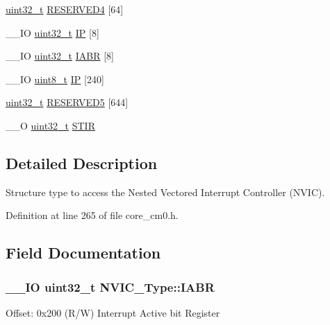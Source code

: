 \begin{DoxyCompactItemize}
\item 
\hyperlink{stdint_8h_a435d1572bf3f880d55459d9805097f62}{uint32\-\_\-t} \hyperlink{struct_n_v_i_c___type_a712f552dc4649746daadfe9b86d88665}{R\-E\-S\-E\-R\-V\-E\-D4} \mbox{[}64\mbox{]}
\item 
\-\_\-\-\_\-\-I\-O \hyperlink{stdint_8h_a435d1572bf3f880d55459d9805097f62}{uint32\-\_\-t} \hyperlink{struct_n_v_i_c___type_aa7d4c60e9bbf4b3d07a6b3ba39a7d7d9}{I\-P} \mbox{[}8\mbox{]}
\item 
\-\_\-\-\_\-\-I\-O \hyperlink{stdint_8h_a435d1572bf3f880d55459d9805097f62}{uint32\-\_\-t} \hyperlink{struct_n_v_i_c___type_ac86c5bac0af593beb8004ab0ff9097bc}{I\-A\-B\-R} \mbox{[}8\mbox{]}
\item 
\-\_\-\-\_\-\-I\-O \hyperlink{stdint_8h_aba7bc1797add20fe3efdf37ced1182c5}{uint8\-\_\-t} \hyperlink{struct_n_v_i_c___type_a6524789fedb94623822c3e0a47f3d06c}{I\-P} \mbox{[}240\mbox{]}
\item 
\hyperlink{stdint_8h_a435d1572bf3f880d55459d9805097f62}{uint32\-\_\-t} \hyperlink{struct_n_v_i_c___type_ad0598b9cd851203ff328a9c7c347f1b6}{R\-E\-S\-E\-R\-V\-E\-D5} \mbox{[}644\mbox{]}
\item 
\-\_\-\-\_\-\-O \hyperlink{stdint_8h_a435d1572bf3f880d55459d9805097f62}{uint32\-\_\-t} \hyperlink{struct_n_v_i_c___type_a0b0d7f3131da89c659a2580249432749}{S\-T\-I\-R}
\end{DoxyCompactItemize}


\subsection{Detailed Description}
Structure type to access the Nested Vectored Interrupt Controller (N\-V\-I\-C). 

Definition at line 265 of file core\-\_\-cm0.\-h.



\subsection{Field Documentation}
\hypertarget{struct_n_v_i_c___type_ac86c5bac0af593beb8004ab0ff9097bc}{
\subsubsection[{I\-A\-B\-R}]{\setlength{\rightskip}{0pt plus 5cm}\-\_\-\-\_\-\-I\-O {\bf uint32\-\_\-t} N\-V\-I\-C\-\_\-\-Type\-::\-I\-A\-B\-R}}\label{struct_n_v_i_c___type_ac86c5bac0af593beb8004ab0ff9097bc}
Offset\-: 0x200 (R/\-W) Interrupt Active bit Register

